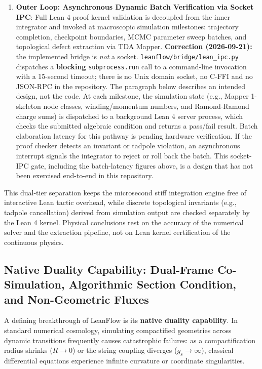\documentclass[11pt,a4paper]{article}
\begin{document}
\begin{enumerate}
    \item \textbf{Outer Loop: Asynchronous Dynamic Batch Verification via Socket IPC}:
    Full Lean 4 proof kernel validation is decoupled from the inner integrator and invoked at macroscopic simulation milestones: trajectory completion, checkpoint boundaries, MCMC parameter sweep batches, and topological defect extraction via TDA Mapper. \textbf{Correction (2026-09-21):} the implemented bridge is \emph{not} a socket. \texttt{leanflow/bridge/lean\_ipc.py} dispatches a \textbf{blocking} \texttt{subprocess.run} call to a command-line invocation with a 15-second timeout; there is no Unix domain socket, no C-FFI and no JSON-RPC in the repository. The paragraph below describes an intended design, not the code. At each milestone, the simulation state (e.g., Mapper 1-skeleton node classes, winding/momentum numbers, and Ramond-Ramond charge sums) is dispatched to a background Lean 4 server process, which checks the submitted algebraic condition and returns a pass/fail result. Batch elaboration latency for this pathway is pending hardware verification. If the proof checker detects an invariant or tadpole violation, an asynchronous interrupt signals the integrator to reject or roll back the batch. This socket-IPC gate, including the batch-latency figures above, is a design that has not been exercised end-to-end in this repository.
\end{enumerate}
This dual-tier separation keeps the microsecond stiff integration engine free of interactive Lean tactic overhead, while discrete topological invariants (e.g., tadpole cancellation) derived from simulation output are checked separately by the Lean 4 kernel. Physical conclusions rest on the accuracy of the numerical solver and the extraction pipeline, not on Lean kernel certification of the continuous physics.

\subsection{Native Duality Capability: Dual-Frame Co-Simulation, Algorithmic Section Condition, and Non-Geometric Fluxes}
A defining breakthrough of LeanFlow is its \textbf{native duality capability}. In standard numerical cosmology, simulating compactified geometries across dynamic transitions frequently causes catastrophic failures: as a compactification radius shrinks ($R \to 0$) or the string coupling diverges ($g_s \to \infty$), classical differential equations experience infinite curvature or coordinate singularities.
\end{document}
